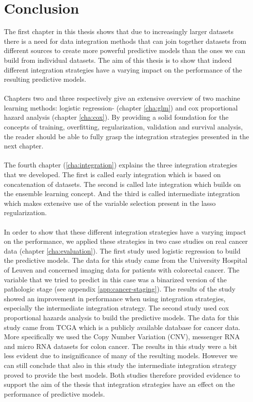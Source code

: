 \chapter{Conclusion}
\label{cha:conclusion}
The first chapter in this thesis shows that due to increasingly larger datasets there is a need for data integration methods that can join together datasets from different sources to create more powerful predictive models than the ones we can build from individual datasets. The aim of this thesis is to show that indeed different integration strategies have a varying impact on the performance of the resulting predictive models. \\ \\
Chapters two and three respectively give an extensive overview of two machine learning methods: logistic regression- (chapter \ref{cha:glm}) and cox proportional hazard analysis (chapter \ref{cha:cox}). By providing a solid foundation for the concepts of training, overfitting, regularization, validation and survival analysis, the reader should be able to fully grasp the integration strategies presented in the next chapter. \\ \\
The fourth chapter (\ref{cha:integration}) explains the three integration strategies that we developed. The first is called early integration which is based on concatenation of datasets. The second is called late integration which builds on the ensemble learning concept. And the third is called intermediate integration which makes extensive use of the variable selection present in the lasso regularization. \\ \\
In order to show that these different integration strategies have a varying impact on the performance, we applied these strategies in two case studies on real cancer data (chapter \ref{cha:evaluation}). The first study used logistic regression to build the predictive models. The data for this study came from the University Hospital of Leuven and concerned imaging data for patients with colorectal cancer. The variable that we tried to predict in this case was a binarized version of the pathologic stage (see appendix \ref{app:cancer-staging}). The results of the study showed an improvement in performance when using integration strategies, especially the intermediate integration strategy. The second study used cox proportional hazards analysis to build the predictive models. The data for this study came from TCGA which is a publicly available database for cancer data. More specifically we used the Copy Number Variation (CNV), messenger RNA and micro RNA datasets for colon cancer. The results in this study were a bit less evident due to insignificance of many of the resulting models. However we can still conclude that also in this study the intermediate integration strategy proved to provide the best models. Both studies therefore provided evidence to support the aim of the thesis that integration strategies have an effect on the performance of predictive models. \\ \\
